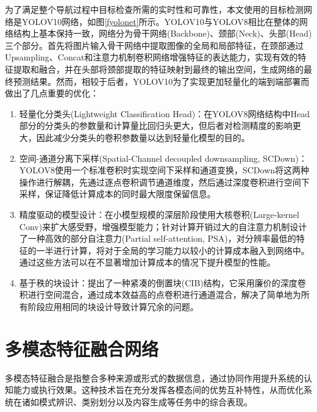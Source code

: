 为了满足整个导航过程中目标检查所需的实时性和可靠性，本文使用的目标检测网络是YOLOV10网络\cite{wang2025yolov10}，如图\ref{fyolonet}所示。YOLOV10与YOLOV8\cite{varghese2024yolov8}相比在整体的网络结构上基本保持一致，网络分为骨干网络(Backbone)、颈部(Neck)、头部(Head)三个部分。首先将图片输入骨干网络中提取图像的全局和局部特征，在颈部通过Upsampling、Concat和注意力机制卷积网络增强特征的表达能力，实现有效的特征提取和融合，并在头部将颈部提取的特征映射到最终的输出空间，生成网络的最终预测结果。然而，相较于后者，YOLOV10为了实现更加轻量化的端到端部署而做出了几点重要的优化：
\begin{enumerate}[topsep = 0 pt, itemsep= 0 pt, parsep=0pt, partopsep=0pt, leftmargin=44pt, itemindent=0pt, labelsep=6pt, label=(\arabic*)]
    \item 	轻量化分类头(Lightweight Classification Head)：在YOLOV8网络结构中Head部分的分类头的参数量和计算量比回归头更大，但后者对检测精度的影响更大，因此减少分类头的卷积参数量以达到轻量化模型的目的。
    \item	空间-通道分离下采样(Spatial-Channel decoupled downsampling, SCDown)：YOLOV8使用一个标准卷积时实现空间下采样和通道变换，SCDown将这两种操作进行解耦，先通过逐点卷积调节通道维度，然后通过深度卷积进行空间下采样，保证降低计算成本的同时最大限度保留信息。
    \item   精度驱动的模型设计：在小模型规模的深层阶段使用大核卷积(Large-kernel Conv)来扩大感受野，增强模型能力；针对计算开销过大的自注意力机制设计了一种高效的部分自注意力(Partial self-attention, PSA)，对分辨率最低的特征的一半进行计算，将对于全局的学习能力以较小的计算成本融入到网络中。通过这些方法可以在不显著增加计算成本的情况下提升模型的性能。
    \item   基于秩的块设计：提出了一种紧凑的倒置块(CIB)结构，它采用廉价的深度卷积进行空间混合，通过成本效益高的点卷积进行通道混合，解决了简单地为所有阶段应用相同的块设计导致计算冗余的问题。
\end{enumerate}


\section{多模态特征融合网络}

多模态特征融合是指整合多种来源或形式的数据信息，通过协同作用提升系统的认知能力或执行效果。这种技术旨在充分发挥各模态间的优势互补特性，从而优化系统在诸如模式辨识、类别划分以及内容生成等任务中的综合表现。

